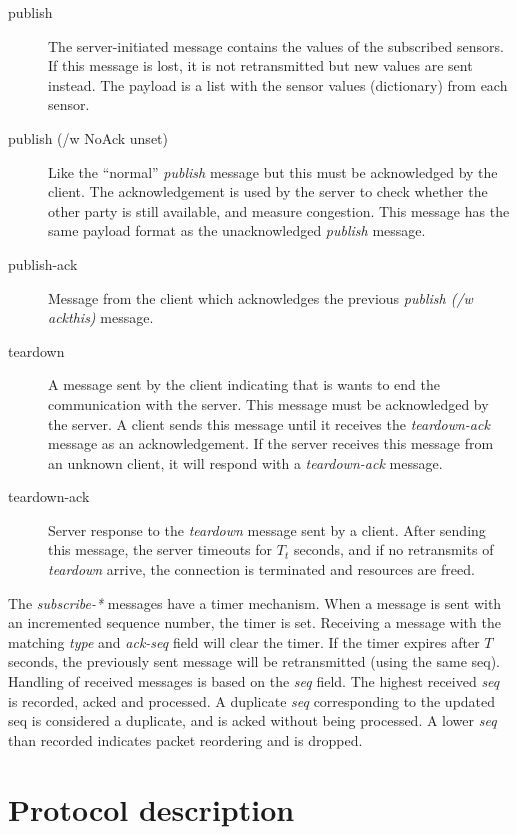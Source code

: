 \documentclass[a4paper]{article}
\begin{document}
\begin{description}
	\item[publish] The server-initiated message contains the values of
	the subscribed sensors. If this message is lost, it is not retransmitted but
	new values are sent instead. The payload is a list with the sensor values 
    (dictionary) from each sensor.
    
	\item[publish (/w NoAck unset)] Like the ``normal'' \emph{publish} message
	but this must be acknowledged by the client. The acknowledgement is used
	by the server to check whether the other party is still	available, and measure
    congestion. This message has the same payload format as the unacknowledged
    \emph{publish} message.
    
	\item[publish-ack] Message from the client which acknowledges the previous
	\emph{publish (/w ackthis)} message.
    
	\item[teardown] A message sent by the client indicating that is 
	wants to end the communication with the server. This message must be 
	acknowledged by the server. A client sends this message until it receives 
	the \emph{teardown-ack} message as an acknowledgement. If the server 
	receives this message from an unknown client, it will respond with a
	\emph{teardown-ack} message.
    
	\item[teardown-ack] Server response to the \emph{teardown} message
	sent by a client. After sending this message, the server timeouts for $T_t$
    seconds, and if no retransmits of \emph{teardown} arrive, the connection is
    terminated and resources are freed.
\end{description}

The \emph{subscribe-*} messages have a timer mechanism.
When a message is sent with an incremented sequence number, the timer is set.
Receiving a message with the matching \emph{type} and \emph{ack-seq} field will clear the timer.
If the timer expires after $T$ seconds, the previously sent message will be retransmitted (using the same seq).
Handling of received messages is based on the \emph{seq} field.
The highest received \emph{seq} is recorded, acked and processed.
A duplicate \emph{seq} corresponding to the updated seq is considered a duplicate, and is acked without being processed.
A lower \emph{seq} than recorded indicates packet reordering and is dropped.

\section{Protocol description}
\end{document}
